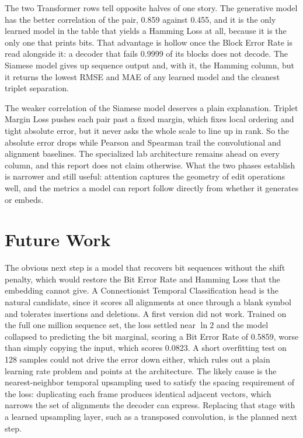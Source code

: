 \documentclass[12pt, letterpaper]{article}
\begin{document}
The two Transformer rows tell opposite halves of one story. The generative model has the better correlation of the pair, 0.859 against 0.455, and it is the only learned model in the table that yields a Hamming Loss at all, because it is the only one that prints bits. That advantage is hollow once the Block Error Rate is read alongside it: a decoder that fails 0.9999 of its blocks does not decode. The Siamese model gives up sequence output and, with it, the Hamming column, but it returns the lowest RMSE and MAE of any learned model and the cleanest triplet separation.

The weaker correlation of the Siamese model deserves a plain explanation. Triplet Margin Loss pushes each pair past a fixed margin, which fixes local ordering and tight absolute error, but it never asks the whole scale to line up in rank. So the absolute error drops while Pearson and Spearman trail the convolutional and alignment baselines. The specialized lab architecture remains ahead on every column, and this report does not claim otherwise. What the two phases establish is narrower and still useful: attention captures the geometry of edit operations well, and the metrics a model can report follow directly from whether it generates or embeds.

\section*{Future Work}
The obvious next step is a model that recovers bit sequences without the shift penalty, which would restore the Bit Error Rate and Hamming Loss that the embedding cannot give. A Connectionist Temporal Classification head is the natural candidate, since it scores all alignments at once through a blank symbol and tolerates insertions and deletions. A first version did not work. Trained on the full one million sequence set, the loss settled near $\ln 2$ and the model collapsed to predicting the bit marginal, scoring a Bit Error Rate of 0.5859, worse than simply copying the input, which scores 0.0823. A short overfitting test on 128 samples could not drive the error down either, which rules out a plain learning rate problem and points at the architecture. The likely cause is the nearest-neighbor temporal upsampling used to satisfy the spacing requirement of the loss: duplicating each frame produces identical adjacent vectors, which narrows the set of alignments the decoder can express. Replacing that stage with a learned upsampling layer, such as a transposed convolution, is the planned next step.
\end{document}
